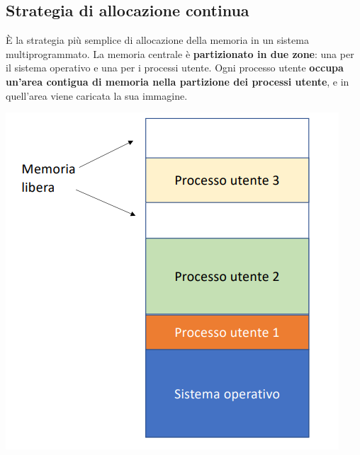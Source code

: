 \documentclass[12pt]{article}
\begin{document}
\subsection{Strategia di allocazione continua}
È la strategia più semplice di allocazione della memoria in un sistema multiprogrammato.
La memoria centrale è \textbf{partizionato in due zone}: una per il sistema operativo e una per i processi utente.
Ogni processo utente \textbf{occupa un'area contigua di memoria nella partizione dei processi utente}, e in quell'area viene caricata la sua immagine.
\begin{center}
    \includegraphics[width = 0.40\linewidth]{Images/53.png}
\end{center}
\end{document}
